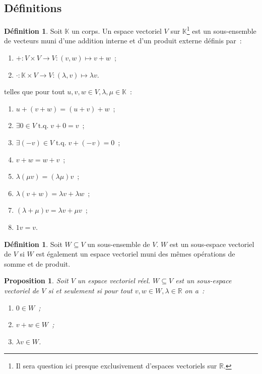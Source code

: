 \documentclass{article}
\DeclareMathOperator{\tq}{\text{ t.q. }}
\newcommand{\R}{\mathbb R}
\newtheorem{prp}[thm]{Proposition}
\theoremstyle{definition}
\newtheorem{déf}[thm]{Définition}
\theoremstyle{remark}
\begin{document}
	\subsection{Définitions}
		\begin{déf} Soit $\mathbb K$ un corps. Un espace vectoriel $V$ sur $\mathbb K$\footnote{Il sera question ici presque exclusivement d'espaces vectoriels sur $\R$.}
		est un sous-ensemble de vecteurs muni d'une addition interne et d'un produit externe définis par~:
		\begin{enumerate}
			\item $+ : V \times V \to V : (v, w) \mapsto v+w$~;
			\item $\cdot : \mathbb K \times V \to V : (\lambda, v) \mapsto \lambda v$.
		\end{enumerate}
		telles que pour tout $u, v, w \in V, \lambda, \mu \in \mathbb K$~:
		\begin{enumerate}
			\item $u + (v + w) = (u + v) + w$~;
			\item $\exists 0 \in V \tq v + 0 = v$~;
			\item $\exists (-v) \in V \tq v + (-v) = 0$~;
			\item $v + w = w + v$~;
			\item $\lambda(\mu v) = (\lambda\mu)v$~;
			\item $\lambda (v+w) = \lambda v + \lambda w$~;
			\item $(\lambda + \mu)v = \lambda v + \mu v$~;
			\item $1v = v$.
		\end{enumerate}
		\end{déf}

		\begin{déf} Soit $W \subseteq V$ un sous-ensemble de $V$. $W$ est un sous-espace vectoriel de $V$ si $W$ est également un espace vectoriel muni des mêmes
		opérations de somme et de produit. \end{déf}

		\begin{prp}\label{conditionsSousEspace} Soit $V$ un espace vectoriel réel. $W \subseteq V$ est un sous-espace vectoriel de $V$ si et seulement si pour tout
		$v, w \in W, \lambda \in \R$ on a~:
		\begin{enumerate}
			\item $0 \in W$~;
			\item $v+w \in W$~;
			\item $\lambda v \in W$.
		\end{enumerate}
		\end{prp}
\end{document}
